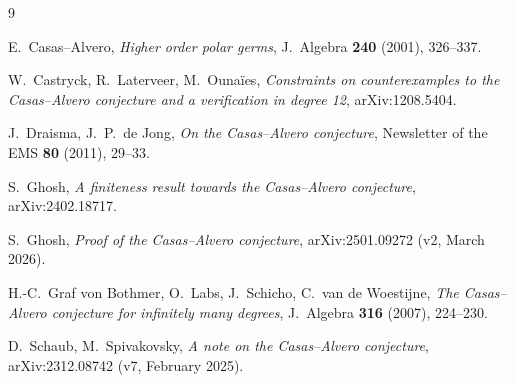 \documentclass[11pt,reqno]{amsart}
\theoremstyle{plain}
\theoremstyle{definition}
\begin{document}
\begin{thebibliography}{9}

 E.~Casas--Alvero, \emph{Higher order polar germs},
  J.~Algebra \textbf{240} (2001), 326--337.

 W.~Castryck, R.~Laterveer, M.~Ounaïes,
  \emph{Constraints on counterexamples to the Casas--Alvero conjecture and a
  verification in degree 12}, arXiv:1208.5404.

 J.~Draisma, J.~P.~de Jong, \emph{On the Casas--Alvero conjecture},
  Newsletter of the EMS \textbf{80} (2011), 29--33.

 S.~Ghosh, \emph{A finiteness result towards the Casas--Alvero
  conjecture}, arXiv:2402.18717.

 S.~Ghosh, \emph{Proof of the Casas--Alvero conjecture},
  arXiv:2501.09272 (v2, March 2026).

 H.-C.~Graf von Bothmer, O.~Labs, J.~Schicho,
  C.~van de Woestijne, \emph{The Casas--Alvero conjecture for infinitely many
  degrees}, J.~Algebra \textbf{316} (2007), 224--230.

 D.~Schaub, M.~Spivakovsky, \emph{A note on the Casas--Alvero
  conjecture}, arXiv:2312.08742 (v7, February 2025).

\end{thebibliography}
\end{document}
